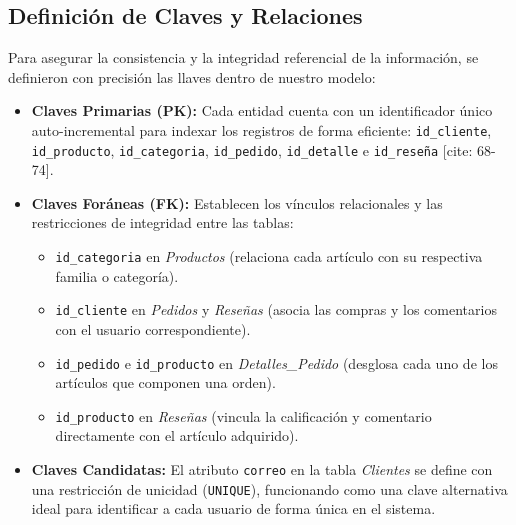 \documentclass[11pt,a4paper]{article}
\begin{document}
\subsection{Definición de Claves y Relaciones}
Para asegurar la consistencia y la integridad referencial de la información, se definieron con precisión las llaves dentro de nuestro modelo:
\begin{itemize}
    \item \textbf{Claves Primarias (PK):} Cada entidad cuenta con un identificador único auto-incremental para indexar los registros de forma eficiente: \texttt{id\_cliente}, \texttt{id\_producto}, \texttt{id\_categoria}, \texttt{id\_pedido}, \texttt{id\_detalle} e \texttt{id\_reseña} [cite: 68-74].
    \item \textbf{Claves Foráneas (FK):} Establecen los vínculos relacionales y las restricciones de integridad entre las tablas:
    \begin{itemize}
        \item \texttt{id\_categoria} en \textit{Productos} (relaciona cada artículo con su respectiva familia o categoría).
        \item \texttt{id\_cliente} en \textit{Pedidos} y \textit{Reseñas} (asocia las compras y los comentarios con el usuario correspondiente).
        \item \texttt{id\_pedido} e \texttt{id\_producto} en \textit{Detalles\_Pedido} (desglosa cada uno de los artículos que componen una orden).
        \item \texttt{id\_producto} en \textit{Reseñas} (vincula la calificación y comentario directamente con el artículo adquirido).
    \end{itemize}
    \item \textbf{Claves Candidatas:} El atributo \texttt{correo} en la tabla \textit{Clientes} se define con una restricción de unicidad (\texttt{UNIQUE}), funcionando como una clave alternativa ideal para identificar a cada usuario de forma única en el sistema.
\end{itemize}
\end{document}
